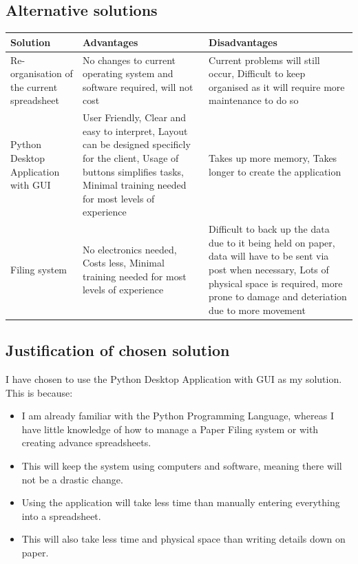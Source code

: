 \subsection{Alternative solutions}
\begin{center}
\begin{tabular}{|p{2.5cm}|p{3.5cm}|p{3.5cm}|}
    \hline
    \textbf{Solution} & \textbf{Advantages} & \textbf{Disadvantages} \\ \hline

    Re-organisation of the current spreadsheet & No changes to current operating system and software required, will not cost & Current problems will still occur, Difficult to keep organised as it will require more maintenance to do so \\ \hline

    Python Desktop Application with GUI & User Friendly, Clear and easy to interpret, Layout can be designed specificly for the client, Usage of buttons simplifies tasks, Minimal training needed for most levels of experience & Takes up more memory, Takes longer to create the application  \\ \hline

    Filing system & No electronics needed, Costs less, Minimal training needed for most levels of experience & Difficult to back up the data due to it being held on paper, data will have to be sent via post when necessary, Lots of physical space is required, more prone to damage and deteriation due to more movement \\ \hline

    \hline
\end{tabular}
\end{center}
\subsection{Justification of chosen solution}
I have chosen to use the Python Desktop Application with GUI as my solution. This is because:

\begin{itemize}
    \item I am already familiar with the Python Programming Language, whereas I have little knowledge of how to manage a Paper Filing system or with creating advance spreadsheets.
    \item This will keep the system using computers and software, meaning there will not be a drastic change.
    \item Using the application will take less time than manually entering everything into a spreadsheet.
    \item This will also take less time and physical space than writing details down on paper.
\end{itemize}
